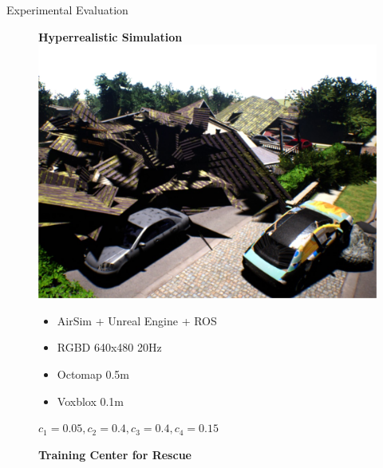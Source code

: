 \documentclass[10pt]{beamer}
\begin{document}
    \begin{frame}{Experimental Evaluation}
        \begin{figure}%
            \begin{minipage}{0.475\linewidth}
                \centering
                \textbf{Hyperrealistic Simulation}
                \includegraphics[width=\textwidth]{images/Fig5a.png}
                \vspace{-0.25cm}
                {
                    \scriptsize
                    \begin{itemize}
                        \item AirSim + Unreal Engine + ROS
                        \item RGBD 640x480 20Hz
                        \item Octomap 0.5m
                        \item Voxblox 0.1m
                    \end{itemize}
                    \vspace{-0.15cm}
                    $c_1=0.05, c_2=0.4, c_3=0.4, c_4=0.15$
                }
            \end{minipage}
            \hspace{0.2cm}
            \begin{minipage}{0.475\linewidth}
                \centering
                \textbf{Training Center for Rescue}

\end{minipage}
\end{figure}
\end{frame}
\end{document}

